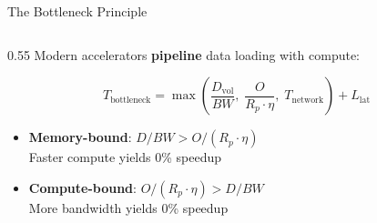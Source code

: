 \documentclass[aspectratio=169, 12pt]{beamer}
\begin{document}
\begin{frame}{The Bottleneck Principle}
\note{
%
%
%
%
%
}

\footnotesize
\begin{columns}[T]
  \begin{column}{0.55\textwidth}
    Modern accelerators \textbf{pipeline} data loading with compute:

    \vspace{0.1cm}
    $$T_{\text{bottleneck}} = \max\!\left(\frac{D_{\text{vol}}}{BW},\; \frac{O}{R_p \cdot \eta},\; T_{\text{network}}\right) + L_{\text{lat}}$$

    \vspace{0.1cm}
    \begin{itemize}\setlength\itemsep{1pt}
      \item \textbf{Memory-bound}: $D/BW > O/(R_p \cdot \eta)$\\
        Faster compute yields \alert{0\% speedup}
      \item \textbf{Compute-bound}: $O/(R_p \cdot \eta) > D/BW$\\
        More bandwidth yields 0\% speedup
    \end{itemize}


\end{column}
\end{columns}
\end{frame}
\end{document}
